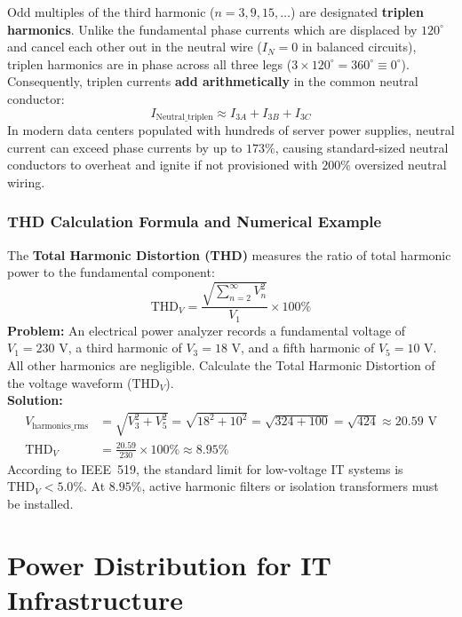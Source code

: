 \begin{keyconcept}
Odd multiples of the third harmonic ($n = 3, 9, 15, \dots$) are designated \textbf{triplen harmonics}. Unlike the fundamental phase currents which are displaced by $120^\circ$ and cancel each other out in the neutral wire ($I_N = 0$ in balanced circuits), triplen harmonics are in phase across all three legs ($3 \times 120^\circ = 360^\circ \equiv 0^\circ$). Consequently, triplen currents \textbf{add arithmetically} in the common neutral conductor:
\[
I_{\text{Neutral\_triplen}} \approx I_{3A} + I_{3B} + I_{3C}
\]
In modern data centers populated with hundreds of server power supplies, neutral current can exceed phase currents by up to $173\%$, causing standard-sized neutral conductors to overheat and ignite if not provisioned with $200\%$ oversized neutral wiring.
\end{keyconcept}

\subsubsection{THD Calculation Formula and Numerical Example}
The \textbf{Total Harmonic Distortion (THD)} measures the ratio of total harmonic power to the fundamental component:
\[
\text{THD}_V = \frac{\sqrt{\sum_{n=2}^{\infty} V_n^2}}{V_1} \times 100\%
\]
\textbf{Problem:} An electrical power analyzer records a fundamental voltage of $V_1 = 230\text{ V}$, a third harmonic of $V_3 = 18\text{ V}$, and a fifth harmonic of $V_5 = 10\text{ V}$. All other harmonics are negligible. Calculate the Total Harmonic Distortion of the voltage waveform ($\text{THD}_V$). \\
\textbf{Solution:}
\begin{align*}
V_{\text{harmonics\_rms}} &= \sqrt{V_3^2 + V_5^2} = \sqrt{18^2 + 10^2} = \sqrt{324 + 100} = \sqrt{424} \approx 20.59\text{ V} \\
\text{THD}_V &= \frac{20.59}{230} \times 100\% \approx 8.95\%
\end{align*}
According to IEEE~519, the standard limit for low-voltage IT systems is $\text{THD}_V < 5.0\%$. At $8.95\%$, active harmonic filters or isolation transformers must be installed.

\section{Power Distribution for IT Infrastructure}

